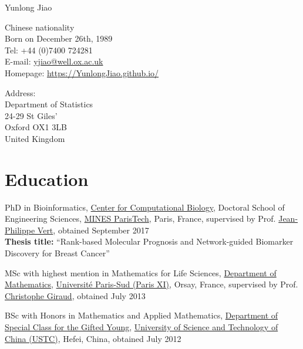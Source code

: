 \documentclass[10pt,a4paper]{article}
\def\name{Yunlong Jiao}
\renewenvironment{itemize}{
  \begin{list}{}{
    \setlength{\leftmargin}{1.2em}
  }
}{
  \end{list}
}
\begin{document}
{\huge \name}


\vspace{0.15in}

\begin{minipage}[t]{0.5\textwidth}
  Chinese nationality \\
  Born on December 26th, 1989 \\
  Tel: +44 (0)7400 724281 \\
  E-mail: \href{mailto:yjiao@well.ox.ac.uk}{yjiao@well.ox.ac.uk} \\
  Homepage: \href{https://YunlongJiao.github.io/}{https://YunlongJiao.github.io/}
\end{minipage}
\begin{minipage}[t]{0.45\textwidth}
  Address: \\
  	Department of Statistics\\
  	24-29 St Giles'\\
  	Oxford OX1 3LB\\
  	United Kingdom
\end{minipage}

\section*{Education}

\begin{itemize}
\item PhD in Bioinformatics, \href{http://cbio.mines-paristech.fr/}{Center for Computational Biology}, Doctoral School of Engineering Sciences, \href{http://www.mines-paristech.fr/}{MINES ParisTech}, Paris, France, supervised by Prof. \href{http://cbio.mines-paristech.fr/~jvert/}{Jean-Philippe Vert}, obtained September 2017\\
\textbf{Thesis title:} ``Rank-based Molecular Prognosis and Network-guided Biomarker Discovery for Breast Cancer''
\item MSc with highest mention in Mathematics for Life Sciences, \href{https://www.math.u-psud.fr/}{Department of Mathematics}, \href{http://www.u-psud.fr/}{Universit\'{e} Paris-Sud (Paris XI)}, Orsay, France, supervised by Prof. \href{http://www.cmap.polytechnique.fr/~giraud/}{Christophe Giraud}, obtained July 2013
\item BSc with Honors in Mathematics and Applied Mathematics, \href{http://scgy.ustc.edu.cn/}{Department of Special Class for the Gifted Young}, \href{http://www.ustc.edu.cn/}{University of Science and Technology of China (USTC)}, Hefei, China, obtained July 2012
\end{itemize}
\end{document}
